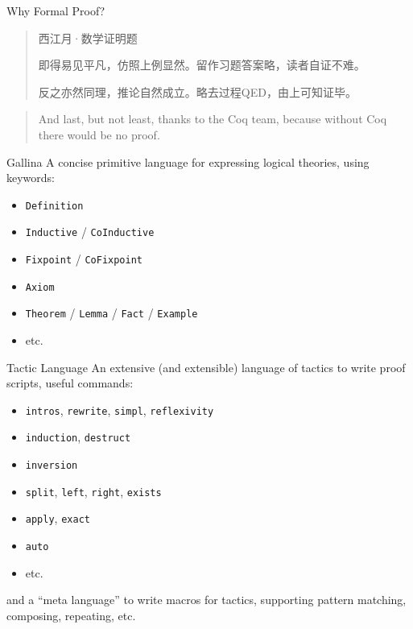 \documentclass[usenames,xcolor=svgnames,11pt,sans,aspectratio=169,handout]{beamer}
\let\t\texttt
\begin{document}
\begin{frame}{Why Formal Proof?}
  \linespread{1.5}
  \begin{quote}
    \begin{center}
      西江月·数学证明题
    \end{center}
    
    即得易见平凡，仿照上例显然。留作习题答案略，读者自证不难。
    
    反之亦然同理，推论自然成立。略去过程QED，由上可知证毕。

  \end{quote}
  \vspace{1cm}
  \pause
  \begin{quote}
    And last, but not least, thanks to the Coq team, because without Coq there would be no proof.

  \end{quote}
\end{frame}

\begin{frame}{Gallina}
  A concise primitive language for expressing logical theories, using keywords:
  \begin{itemize}
    \item \t{Definition}
    \item \t{Inductive} / \t{CoInductive}
    \item \t{Fixpoint} / \t{CoFixpoint}
    \item \t{Axiom}
    \item \t{Theorem} / \t{Lemma} / \t{Fact} / \t{Example}
    \item etc.
  \end{itemize}
\end{frame}

\begin{frame}{Tactic Language}
  An extensive (and extensible) language of tactics to write proof scripts, useful commands:
  \begin{itemize}
    \item \t{intros}, \t{rewrite}, \t{simpl}, \t{reflexivity}
    \item \t{induction}, \t{destruct}
    \item \t{inversion}
    \item \t{split}, \t{left}, \t{right}, \t{exists}
    \item \t{apply}, \t{exact}
    \item \t{auto}
    \item etc.
  \end{itemize}
  and a ``meta language'' to write macros for tactics, supporting pattern matching, composing,
  repeating, etc.
\end{frame}
\end{document}
